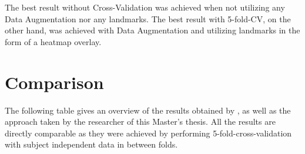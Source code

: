 The best result without Cross-Validation was achieved when not utilizing any Data Augmentation nor any landmarks. The best result with 5-fold-CV, on the other hand, was achieved with Data Augmentation and utilizing landmarks in the form of a heatmap overlay.

\section{Comparison}
The following table gives an overview of the results obtained by \citet{Kossaifi:2017:AFEW-VADatabase},  \citet{Handrich:2020:SimultaneousPredVA} as well as the approach taken by the researcher of this Master's thesis. All the results are directly comparable as they were achieved by performing 5-fold-cross-validation with subject independent data in between folds.


